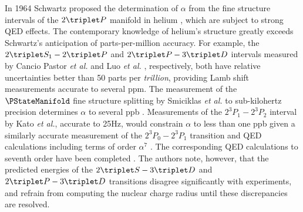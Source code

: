   In 1964 Schwartz proposed the determination of $\alpha$ from the fine structure intervals of the $2\triplet P$ manifold in helium \cite{Schwartz64}, which are subject to strong QED effects.
	The contemporary knowledge of helium's structure greatly exceeds Schwartz's anticipation of parts-per-million accuracy.
	For example, the $2\triplet S_1 - 2\triplet P$ and $2\triplet P - 3\triplet D$ intervals measured by Cancio Pastor \textit{et al.} \cite{Pastor04} and Luo \emph{et al.} \cite{Luo15}, respectively, both have relative uncertainties better than 50 parts per \emph{trillion}, providing Lamb shift measurements accurate to several ppm.
	The measurement of the $\PStateManifold$ fine structure splitting by Smiciklas \textit{et al.} to sub-kilohertz precision determines $\alpha$ to several ppb \cite{Smiciklas10}.
	Measurements of the $2^{3\!}P_1-2^{3\!}P_2$ interval by Kato \emph{et al.}, accurate to 25Hz, would constrain $\alpha$ to less than one ppb given a similarly accurate measurement of the $2^{3\!}P_0 - 2^{3\!}P_1$ transition and QED calculations including terms of order $\alpha^7$ \cite{Kato18}.
	The corresponding QED calculations to seventh order have been completed \cite{Patkos21}. The authors note, however, that the predicted energies of the $2\triplet S - 3 \triplet D$ and $2\triplet P - 3 \triplet D$ transitions disagree significantly with experiments, and refrain from computing the nuclear charge radius until these discrepancies are resolved.
	

